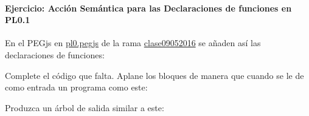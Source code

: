\paragraph{Ejercicio: Acción Semántica para las Declaraciones de
funciones en
PL0.1}\label{ejercicio-acciuxf3n-semuxe1ntica-para-las-declaraciones-de-funciones-en-pl0.1}

En el PEGjs en
\href{https://github.com/crguezl/pegjscalc/blob/clase10052016/lib/pl0.pegjs}{pl0.pegjs}
de la rama
\href{https://github.com/crguezl/pegjscalc/tree/clase10052016}{clase09052016}
se añaden así las declaraciones de funciones:

\begin{Shaded}
\begin{Highlighting}[]
                        \NormalTok{\{}
                        \NormalTok{\}}
\end{Highlighting}
\end{Shaded}

Complete el código que falta. Aplane los bloques de manera que cuando se
le de como entrada un programa como este:

\begin{Shaded}
\begin{Highlighting}[]
 \NormalTok{, }
      \NormalTok{;}
 
 
   
   
     \NormalTok{;}
  \NormalTok{\{ }
        
      \NormalTok{);}
  \NormalTok{\};}
\NormalTok{\{}
  \NormalTok{;}
\NormalTok{\}}
\end{Highlighting}
\end{Shaded}

Produzca un árbol de salida similar a este:

